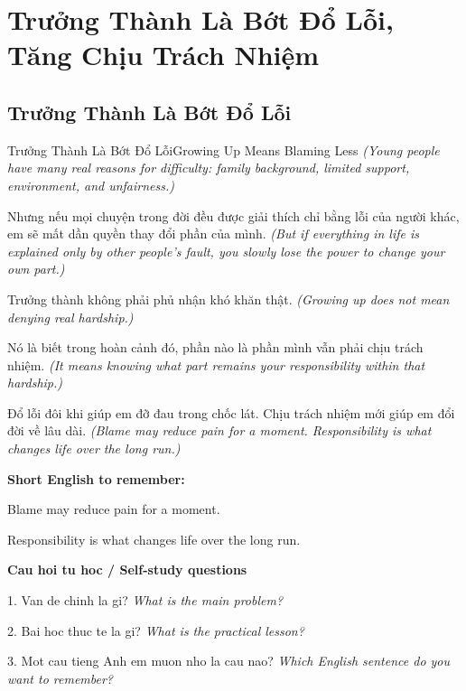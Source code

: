 \chapter{Trưởng Thành Là Bớt Đổ Lỗi, Tăng Chịu Trách Nhiệm}

\section{Trưởng Thành Là Bớt Đổ Lỗi}
\begin{truyen}{Trưởng Thành Là Bớt Đổ Lỗi}{Growing Up Means Blaming Less}
\textit{(Young people have many real reasons for difficulty: family background, limited support, environment, and unfairness.)}

Nhưng nếu mọi chuyện trong đời đều được giải thích chỉ bằng lỗi của người khác, em sẽ mất dần quyền thay đổi phần của mình.
\textit{(But if everything in life is explained only by other people’s fault, you slowly lose the power to change your own part.)}

Trưởng thành không phải phủ nhận khó khăn thật.
\textit{(Growing up does not mean denying real hardship.)}

Nó là biết trong hoàn cảnh đó, phần nào là phần mình vẫn phải chịu trách nhiệm.
\textit{(It means knowing what part remains your responsibility within that hardship.)}

\end{truyen}

\begin{baihoc}
Đổ lỗi đôi khi giúp em đỡ đau trong chốc lát. Chịu trách nhiệm mới giúp em đổi đời về lâu dài.
\textit{(Blame may reduce pain for a moment. Responsibility is what changes life over the long run.)}
\end{baihoc}

\begin{ghinhoanh}
\textbf{Short English to remember:}

Blame may reduce pain for a moment.

Responsibility is what changes life over the long run.

\end{ghinhoanh}

\begin{tuhocnhanh}
\textbf{Cau hoi tu hoc / Self-study questions}

1. Van de chinh la gi? \textit{What is the main problem?}

2. Bai hoc thuc te la gi? \textit{What is the practical lesson?}

3. Mot cau tieng Anh em muon nho la cau nao? \textit{Which English sentence do you want to remember?}
\end{tuhocnhanh}
\ngancach


